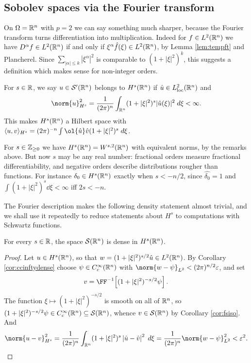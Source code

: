 \documentclass[a4paper]{scrartcl}
\newcommand{\ip}[2]{\langle #1, #2 \rangle}
\newcommand{\Sch}{\mathcal{S}}
\begin{document}
\subsection{Sobolev spaces via the Fourier transform}

On $\Omega=\mathbb{R}^n$ with $p = 2$ we can say something much sharper, because the Fourier transform turns differentiation into multiplication. Indeed for $f \in L^2(\mathbb{R}^n)$ we have $D^\alpha f \in L^2(\mathbb{R}^n)$ if and only if $\xi^\alpha\hat f(\xi)\in L^2(\mathbb{R}^n)$, by Lemma \ref{lem:tempft} and Plancherel. Since $\sum_{|\alpha|\le k}|\xi^\alpha|^2$ is comparable to $(1+|\xi|^2)^k$, this suggests a definition which makes sense for non-integer orders.

\begin{definition}
	For $s\in\mathbb{R}$, we say $u \in \Sch'(\R^n)$ belongs to $H^s(\mathbb{R}^n)$ if $\hat u \in L^2_{\mathrm{loc}}(\mathbb{R}^n)$ and
	$$\norm{u}_{H^s}^2 = \frac{1}{(2\pi)^n}\int_{\R^n}(1+|\xi|^2)^s|\hat u(\xi)|^2\dd\xi<\infty.$$
	This makes $H^s(\mathbb{R}^n)$ a Hilbert space with $\ip{u}{v}_{H^s}=(2\pi)^{-n}\int\ol{\hat u}\hat v(1+|\xi|^2)^s\dd\xi$.
\end{definition}

For $s \in \mathbb{Z}_{\ge0}$ we have $H^s(\mathbb{R}^n)=W^{s,2}(\mathbb{R}^n)$ with equivalent norms, by the remarks above. But now $s$ may be any real number: fractional orders measure fractional differentiability, and negative orders describe distributions rougher than functions. For instance $\delta_0 \in H^s(\mathbb{R}^n)$ exactly when $s < -n/2$, since $\hat{\delta_0}=1$ and $\int(1+|\xi|^2)^s\dd\xi<\infty$ iff $2s<-n$.

The Fourier description makes the following density statement almost trivial, and we shall use it repeatedly to reduce statements about $H^s$ to computations with Schwartz functions.

\begin{lemma}\label{lem:schwartzdense}
	For every $s \in \mathbb{R}$, the space $\Sch(\R^n)$ is dense in $H^s(\mathbb{R}^n)$.
\end{lemma}

\begin{proof}
	Let $u \in H^s(\mathbb{R}^n)$, so that $w = (1+|\xi|^2)^{s/2}\hat u \in L^2(\mathbb{R}^n)$. By Corollary \ref{cor:ccinftydense} choose $\psi \in C_c^\infty(\mathbb{R}^n)$ with $\norm{w - \psi}_{L^2}<(2\pi)^{n/2}\varepsilon$, and set
	$$v = \FF^{-1}\!\left[ (1+|\xi|^2)^{-s/2}\psi\right].$$
	The function $\xi\mapsto(1+|\xi|^2)^{-s/2}$ is smooth on all of $\mathbb{R}^n$, so $(1+|\xi|^2)^{-s/2}\psi \in C_c^\infty(\R^n)\subseteq\Sch(\R^n)$, whence $v \in \Sch(\R^n)$ by Corollary \ref{cor:fsiso}. And
	$$\norm{u-v}_{H^s}^2=\frac{1}{(2\pi)^n}\int_{\R^n}(1+|\xi|^2)^s\left|\hat u - \hat v\right|^2\dd\xi = \frac{1}{(2\pi)^n}\norm{w-\psi}^2_{L^2}<\varepsilon^2. \qedhere$$
\end{proof}
\end{document}
